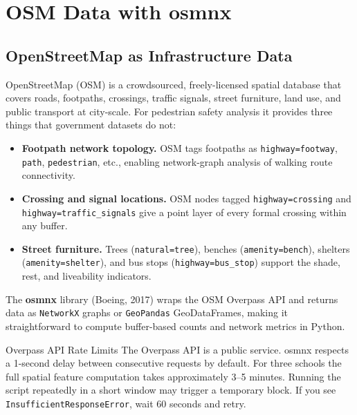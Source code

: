 \documentclass[11pt,a4paper,openany]{book}
\begin{document}
\chapter{OSM Data with osmnx}

\section{OpenStreetMap as Infrastructure Data}

OpenStreetMap (OSM) is a crowdsourced, freely-licensed spatial database that covers roads, footpaths, crossings, traffic signals, street furniture, land use, and public transport at city-scale. For pedestrian safety analysis it provides three things that government datasets do not:

\begin{itemize}
  \item \textbf{Footpath network topology.} OSM tags footpaths as \texttt{highway=footway}, \texttt{path}, \texttt{pedestrian}, etc., enabling network-graph analysis of walking route connectivity.
  \item \textbf{Crossing and signal locations.} OSM nodes tagged \texttt{highway=crossing} and \texttt{highway=traffic\_signals} give a point layer of every formal crossing within any buffer.
  \item \textbf{Street furniture.} Trees (\texttt{natural=tree}), benches (\texttt{amenity=bench}), shelters (\texttt{amenity=shelter}), and bus stops (\texttt{highway=bus\_stop}) support the shade, rest, and liveability indicators.
\end{itemize}

The \textbf{osmnx} library (Boeing, 2017) wraps the OSM Overpass API and returns data as \texttt{NetworkX} graphs or \texttt{GeoPandas} GeoDataFrames, making it straightforward to compute buffer-based counts and network metrics in Python.

\begin{keybox}{Overpass API Rate Limits}
The Overpass API is a public service. osmnx respects a 1-second delay between consecutive requests by default. For three schools the full spatial feature computation takes approximately 3--5 minutes. Running the script repeatedly in a short window may trigger a temporary block. If you see \texttt{InsufficientResponseError}, wait 60 seconds and retry.
\end{keybox}
\end{document}
